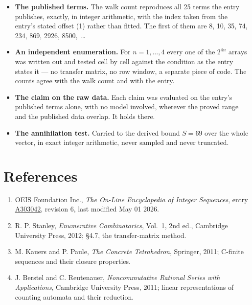 \documentclass[11pt]{article}
\theoremstyle{definition}
\begin{document}
\begin{itemize}

\item {\bfseries The published terms.} The walk count reproduces all 25 terms the entry publishes, exactly, in integer arithmetic, with the index taken from the entry's stated offset (1) rather than fitted. The first of them are 8, 10, 35, 74, 234, 869, 2926, 8500,~\dots

\item {\bfseries An independent enumeration.} For $n = 1,\dots,4$ every one of the $2^{4n}$ arrays was written out and tested cell by cell against the condition as the entry states it --- no transfer matrix, no row window, a separate piece of code. The counts agree with the walk count and with the entry.

\item {\bfseries The claim on the raw data.} Each claim was evaluated on the entry's published terms alone, with no model involved, wherever the proved range and the published data overlap. It holds there.

\item {\bfseries The annihilation test.} Carried to the derived bound $S = 69$ over the whole vector, in exact integer arithmetic, never sampled and never truncated.

\end{itemize}

\section{References}

\begin{enumerate}

\item OEIS Foundation Inc., \emph{The On-Line Encyclopedia of Integer Sequences}, entry \href{https://oeis.org/A303042}{A303042}, revision 6, last modified May 01 2026.

\item R. P. Stanley, \emph{Enumerative Combinatorics}, Vol.~1, 2nd ed., Cambridge University Press, 2012; \S4.7, the transfer-matrix method.

\item M. Kauers and P. Paule, \emph{The Concrete Tetrahedron}, Springer, 2011; C-finite sequences and their closure properties.

\item J. Berstel and C. Reutenauer, \emph{Noncommutative Rational Series with Applications}, Cambridge University Press, 2011; linear representations of counting automata and their reduction.

\end{enumerate}
\end{document}
